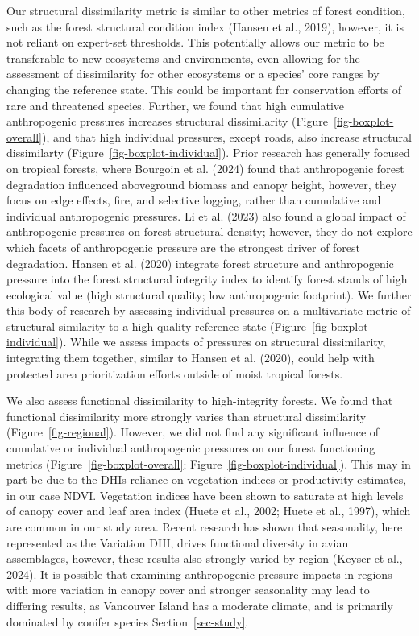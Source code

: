\documentclass[
]{agujournal2019}
\begin{document}
Our structural dissimilarity metric is similar to other metrics of
forest condition, such as the forest structural condition index (Hansen
et al., 2019), however, it is not reliant on expert-set thresholds. This
potentially allows our metric to be transferable to new ecosystems and
environments, even allowing for the assessment of dissimilarity for
other ecosystems or a species' core ranges by changing the reference
state. This could be important for conservation efforts of rare and
threatened species. Further, we found that high cumulative anthropogenic
pressures increases structural dissimilarity
(Figure~\ref{fig-boxplot-overall}), and that high individual pressures,
except roads, also increase structural dissimilarty
(Figure~\ref{fig-boxplot-individual}). Prior research has generally
focused on tropical forests, where Bourgoin et al. (2024) found that
anthropogenic forest degradation influenced aboveground biomass and
canopy height, however, they focus on edge effects, fire, and selective
logging, rather than cumulative and individual anthropogenic pressures.
Li et al. (2023) also found a global impact of anthropogenic pressures
on forest structural density; however, they do not explore which facets
of anthropogenic pressure are the strongest driver of forest
degradation. Hansen et al. (2020) integrate forest structure and
anthropogenic pressure into the forest structural integrity index to
identify forest stands of high ecological value (high structural
quality; low anthropogenic footprint). We further this body of research
by assessing individual pressures on a multivariate metric of structural
similarity to a high-quality reference state
(Figure~\ref{fig-boxplot-individual}). While we assess impacts of
pressures on structural dissimilarity, integrating them together,
similar to Hansen et al. (2020), could help with protected area
prioritization efforts outside of moist tropical forests.

We also assess functional dissimilarity to high-integrity forests. We
found that functional dissimilarity more strongly varies than structural
dissimilarity (Figure~\ref{fig-regional}). However, we did not find any
significant influence of cumulative or individual anthropogenic
pressures on our forest functioning metrics
(Figure~\ref{fig-boxplot-overall}; Figure~\ref{fig-boxplot-individual}).
This may in part be due to the DHIs reliance on vegetation indices or
productivity estimates, in our case NDVI. Vegetation indices have been
shown to saturate at high levels of canopy cover and leaf area index
(Huete et al., 2002; Huete et al., 1997), which are common in our study
area. Recent research has shown that seasonality, here represented as
the Variation DHI, drives functional diversity in avian assemblages,
however, these results also strongly varied by region (Keyser et al.,
2024). It is possible that examining anthropogenic pressure impacts in
regions with more variation in canopy cover and stronger seasonality may
lead to differing results, as Vancouver Island has a moderate climate,
and is primarily dominated by conifer species Section~\ref{sec-study}.
\end{document}

